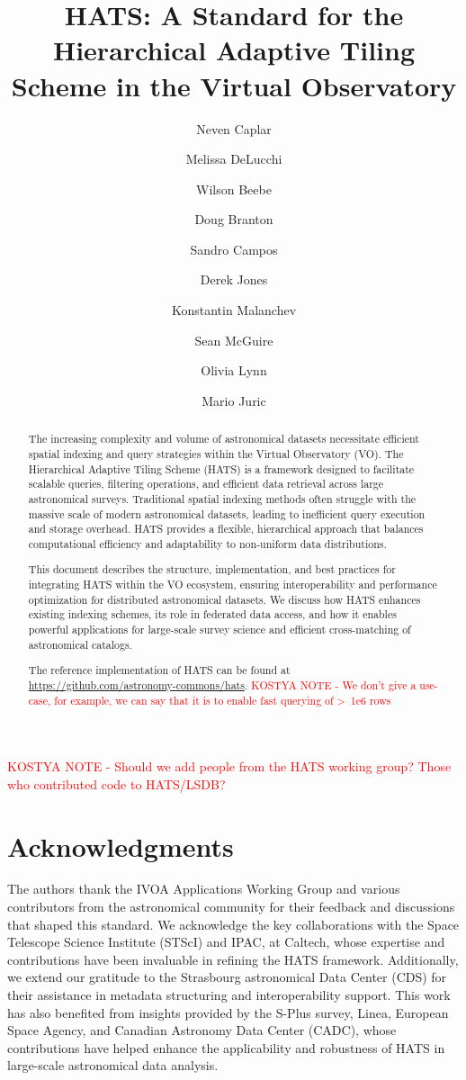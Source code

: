 \documentclass[11pt,a4paper]{ivoa}
\title{HATS: A Standard for the Hierarchical Adaptive Tiling Scheme in the Virtual Observatory}
\author[https://www.ivoa.net/authors/caplar]{Neven Caplar}
\author[https://www.ivoa.net/authors/delucchi]{Melissa DeLucchi}
\author[https://www.ivoa.net/authors/beebe]{Wilson Beebe}
\author[https://www.ivoa.net/authors/branton]{Doug Branton}
\author[https://www.ivoa.net/authors/campos]{Sandro Campos}
\author[https://www.ivoa.net/authors/jones]{Derek Jones}
\author[https://www.ivoa.net/authors/malanchev]{Konstantin Malanchev}
\author[https://www.ivoa.net/authors/mcguire]{Sean McGuire}
\author[https://www.ivoa.net/authors/lynn]{Olivia Lynn}
\author[https://www.ivoa.net/authors/juric]{Mario Juric}
\begin{document}
\textcolor{red}{KOSTYA NOTE - Should we add people from the HATS working group? Those who contributed code to HATS/LSDB?}
\begin{abstract}
The increasing complexity and volume of astronomical datasets necessitate efficient spatial indexing and query strategies within the Virtual Observatory (VO). 
The Hierarchical Adaptive Tiling Scheme (HATS) is a framework designed to facilitate scalable queries, filtering operations, and efficient data retrieval across large astronomical surveys. 
Traditional spatial indexing methods often struggle with the massive scale of modern astronomical datasets, leading to inefficient query execution and storage overhead. 
HATS provides a flexible, hierarchical approach that balances computational efficiency and adaptability to non-uniform data distributions.\par

This document describes the structure, implementation, and best practices for integrating HATS within the VO ecosystem, ensuring interoperability and performance optimization for distributed astronomical datasets. We discuss how HATS enhances existing indexing schemes, its role in federated data access, and how it enables powerful applications for large-scale survey science and efficient cross-matching of astronomical catalogs. \par 
The reference implementation of HATS can be found at \url{https://github.com/astronomy-commons/hats}. 
\textcolor{red}{KOSTYA NOTE - We don't give a use-case, for example, we can say that it is to enable fast querying of >~1e6 rows}

\end{abstract}

\section*{Acknowledgments}
The authors thank the IVOA Applications Working Group and various contributors from the astronomical community for their feedback and discussions that shaped this standard. 
We acknowledge the key collaborations with the Space Telescope Science Institute (STScI) and IPAC, at Caltech, whose expertise and contributions have been invaluable in refining the HATS framework. 
Additionally, we extend our gratitude to  the Strasbourg astronomical Data Center (CDS) for their assistance in metadata structuring and interoperability support. 
This work has also benefited from insights provided by the S-Plus survey, Linea, European Space Agency, and Canadian Astronomy Data Center (CADC), whose contributions have helped enhance the applicability and robustness of HATS in large-scale astronomical data analysis. \par
\end{document}
